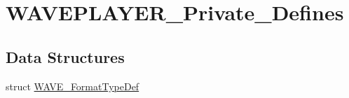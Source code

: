 \hypertarget{group___w_a_v_e_p_l_a_y_e_r___private___defines}{\section{\-W\-A\-V\-E\-P\-L\-A\-Y\-E\-R\-\_\-\-Private\-\_\-\-Defines}
\label{group___w_a_v_e_p_l_a_y_e_r___private___defines}
}
\subsection*{\-Data \-Structures}
\begin{DoxyCompactItemize}
\item 
struct \hyperlink{struct_w_a_v_e___format_type_def}{\-W\-A\-V\-E\-\_\-\-Format\-Type\-Def}
\end{DoxyCompactItemize}
